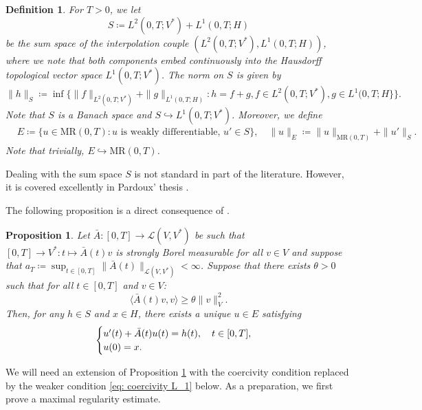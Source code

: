 \documentclass{amsart}
\renewcommand{\MR}{\mathrm{MR}}
\newcommand{\<}{\langle}
\newcommand{\?}{\rangle}
\newcommand{\into}{\hookrightarrow}
\theoremstyle{plain}
\theoremstyle{remark}
\theoremstyle{plain}
\newtheorem{proposition}[theorem]{Proposition}
\newtheorem{definition}[theorem]{Definition}
\numberwithin{equation}{section}
\begin{document}
\begin{definition}\label{def: spaces for method of continuity}
For $T>0$, we let
\[
S\coloneqq L^2(0,T;V^*)+L^1(0,T;H)
\]
be the sum space of the interpolation couple $(L^2(0,T;V^*),L^1(0,T;H))$, where we note that both components embed continuously into the Hausdorff topological vector space $L^1(0,T;V^*)$. The norm on $S$ is given by
\[
\|h\|_S\coloneqq \inf\big\{\|f\|_{L^2(0,T;V^*)}+\|g\|_{L^1(0,T;H)}: h=f+g, f\in L^2(0,T;V^*), g\in L^1(0,T;H \}\big\}.
\]
Note that $S$ is a Banach space \cite[Prop. C.1.3]{HNVWvolume1} and $S\into L^1(0,T;V^*)$.
Moreover, we define
\begin{align*}
&E\coloneqq \{u\in \MR(0,T):u \text{ is weakly differentiable, } u'\in S\},\quad \|u\|_E\coloneqq \|u\|_{\MR(0,T)}+\|u'\|_{S}.
\end{align*}
Note that trivially, $E\into \MR(0,T)$.
\end{definition}
Dealing with the sum space $S$ is not standard in part of the literature. However, it is covered excellently in Pardoux' thesis \cite{pardoux}.

The following proposition is a direct consequence of \cite[Th. 2.1]{pardoux}.

\begin{proposition}\label{prop: surjectivity L_0}
  Let $\bar{A}\colon [0,T]\to\mathcal{L}(V,V^*)$ be such that
   $[0,T]\to V^*\colon t\mapsto \bar{A}(t)v$ is strongly Borel measurable for all $v\in V$
  and suppose that $a_T\coloneqq \sup_{t\in[0,T]}\|\bar{A}(t)\|_{\mathcal{L}(V,V^*)}<\infty$.
  Suppose that there exists $\theta>0$ such that for all $t\in[0,T]$ and $v\in V$:
  \begin{equation*}
   \<\bar{A}(t)v,v\?\geq \theta \|v\|_V^2.
  \end{equation*}
  Then, for any $h\in S$ and $x\in H$, there exists a unique $u\in E$ satisfying
  \begin{equation}\label{eq: eq bar{A}}
    \begin{cases}
    u'(t)+\bar{A}(t)u(t)=h(t), \quad t\in[0,T],\\
    u(0)=x.
  \end{cases}
  \end{equation}
\end{proposition}


We will need an extension of Proposition \ref{prop: surjectivity L_0} with the coercivity condition replaced by the weaker condition \eqref{eq: coercivity L_1} below. As a preparation, we first prove a maximal regularity estimate.
\end{document}
